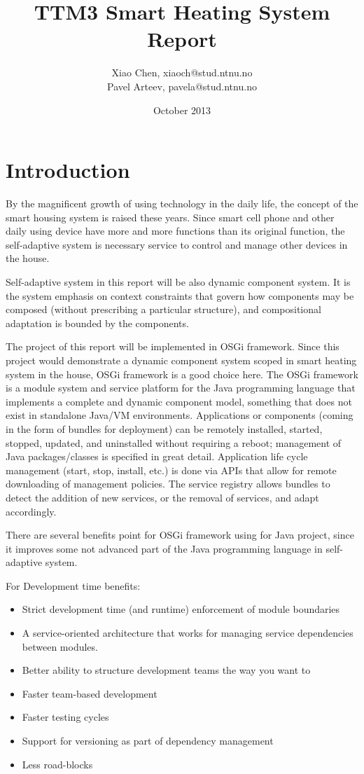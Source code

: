 \documentclass{article}
\title{TTM3 Smart Heating System Report}
\author{Xiao Chen, xiaoch@stud.ntnu.no\\
Pavel Arteev, pavela@stud.ntnu.no}
\date{October 2013}
\begin{document}
\maketitle

\section{Introduction}

\par By the magnificent growth of using technology in the daily life, the concept of the smart housing system is raised these years. Since smart cell phone and other daily using device have more and more functions  than its original function, the self-adaptive system is necessary service to control and manage other devices in the house.

\par Self-adaptive system in this report will be also dynamic component system. It is the system emphasis on context constraints that govern how components may be composed (without prescribing a particular structure), and compositional adaptation is bounded by the components.

\par The project of this report will be implemented in OSGi\cite{osgi} framework. Since this project would demonstrate a dynamic component system scoped in smart heating system in the house, OSGi framework is a good choice here. The OSGi framework is a module system and service platform for the Java programming language that implements a complete and dynamic component model, something that does not exist in standalone Java/VM environments. Applications or components (coming in the form of bundles for deployment) can be remotely installed, started, stopped, updated, and uninstalled without requiring a reboot; management of Java packages/classes is specified in great detail. Application life cycle management (start, stop, install, etc.) is done via APIs that allow for remote downloading of management policies. The service registry allows bundles to detect the addition of new services, or the removal of services, and adapt accordingly.

\par There are several benefits point for OSGi framework using for Java project, since it improves some not advanced part of the Java programming language in self-adaptive system.
\par For Development time benefits\cite{osgi_benefit}:
\begin{itemize}
  	\item Strict development time (and runtime) enforcement of module boundaries
	\item A service-oriented architecture that works for managing service dependencies between modules.
	\item Better ability to structure development teams the way you want to
	\item Faster team-based development
	\item Faster testing cycles
	\item Support for versioning as part of dependency management
	\item Less road-blocks
  \end{itemize}
  
\end{document}
